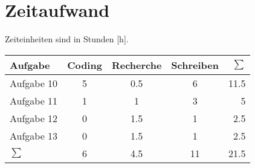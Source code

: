 \section{Zeitaufwand}
Zeiteinheiten sind in Stunden [h].
\begin{table}[h]
    \begin{tabular}{l|ccc|r}
        Aufgabe & Coding & Recherche & Schreiben & $\sum$\\\hline
        Aufgabe 10 & 5 & 0.5 & 6  & 11.5 \\
        Aufgabe 11 & 1 & 1   & 3  & 5 \\
        Aufgabe 12 & 0 & 1.5 & 1  & 2.5 \\
        Aufgabe 13 & 0 & 1.5   & 1  & 2.5 \\\hline
        $\sum$     & 6 & 4.5   & 11 & 21.5
    \end{tabular}
\end{table}